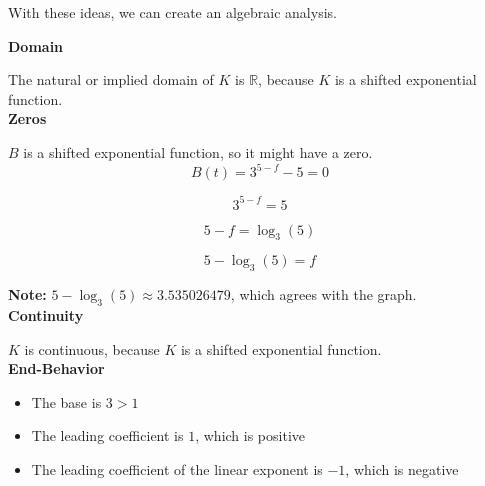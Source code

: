 \documentclass{ximera}
\begin{document}
\begin{example}
\begin{idea}
\begin{image}
\end{image}


With these ideas, we can create an algebraic analysis. \\


\end{idea}





\textbf{Domain}

The natural or implied domain of $K$ is $\mathbb{R}$, because $K$ is a shifted exponential function. \\


\textbf{Zeros}

$B$ is a shifted exponential function, so it might have a zero. \\





\[ B(t) = 3^{5 - f} - 5 = 0 \]


\[ 3^{5 - f} = 5 \]

\[ 5 - f = \log_3(5) \]

\[ 5 - \log_3(5) = f \]


\textbf{Note:}  $5 - \log_3(5) \approx 3.535026479$, which agrees with the graph. \\




\textbf{Continuity}

$K$ is continuous, because $K$ is a shifted exponential function. \\





\textbf{End-Behavior}


\begin{itemize}
  \item The base is $3 > 1$
  \item The leading coefficient is $1$, which is positive
  \item The leading coefficient of the linear exponent is $-1$, which is negative
\end{itemize}



\end{example}
\end{document}
